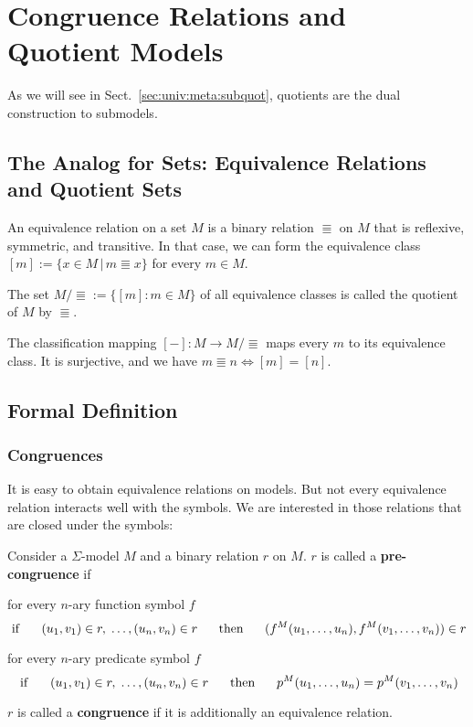 \section{Congruence Relations and Quotient Models}\label{sec:univ:quot}

As we will see in Sect.~\ref{sec:univ:meta:subquot}, quotients are the dual construction to submodels.

\subsection{The Analog for Sets: Equivalence Relations and Quotient Sets}

An equivalence relation on a set $M$ is a binary relation $\Equiv$ on $M$ that is reflexive, symmetric, and transitive.
In that case, we can form the equivalence class $[m]:=\{x\in M\,|\,m\Equiv x\}$ for every $m\in M$.

The set $M/\Equiv:=\{[m]:m\in M\}$ of all equivalence classes is called the quotient of $M$ by $\Equiv$.

The classification mapping $[-]:M\to M/\Equiv$ maps every $m$ to its equivalence class.
It is surjective, and we have $m\Equiv n\iff [m]=[n]$.

\subsection{Formal Definition}

\subsubsection{Congruences}

It is easy to obtain equivalence relations on models.
But not every equivalence relation interacts well with the symbols.
We are interested in those relations that are closed under the symbols:

\begin{definition}
Consider a $\Sigma$-model $M$ and a binary relation $r$ on $M$.
$r$ is called a \textbf{pre-congruence} if
\begin{compactitem}
\item for every $n$-ary function symbol $f$
  \[\;\mathrm{if}\;\hspace*{.5cm} (u_1,v_1)\in r,\;\ldots,(u_n,v_n)\in r\hspace*{.5cm}\;\mathrm{then}\;\hspace*{.5cm} (f^M(u_1,\ldots,u_n),f^M(v_1,\ldots,v_n))\in r\]
\item for every $n$-ary predicate symbol $f$
  \[\;\mathrm{if}\;\hspace*{.5cm} (u_1,v_1)\in r,\;\ldots,(u_n,v_n)\in r\hspace*{.5cm}\;\mathrm{then}\;\hspace*{.5cm} p^M(u_1,\ldots,u_n)=p^M(v_1,\ldots,v_n)\]
\end{compactitem}
$r$ is called a \textbf{congruence} if it is additionally an equivalence relation.
\end{definition}

